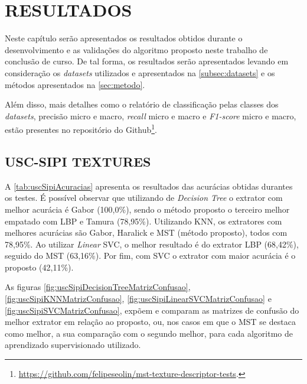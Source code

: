 
\chapter{RESULTADOS}
\label{chap:resultados}

\par Neste capítulo serão apresentados os resultados obtidos durante o desenvolvimento e as validações do algoritmo proposto neste trabalho de conclusão de curso. De tal forma, os resultados serão apresentados levando em consideração os \textit{datasets} utilizados e apresentados na \autoref{subsec:datasets} e os métodos apresentados na \autoref{sec:metodo}.
\par Além disso, mais detalhes como o relatório de classificação pelas classes dos \textit{datasets}, precisão micro e macro, \textit{recall} micro e macro e \textit{F1-score} micro e macro, estão presentes no repositório do Github\footnote{\url{https://github.com/felipeseolin/mst-texture-descriptor-tests}.}.

\section{USC-SIPI TEXTURES}
\label{sec:uscSipiTextures}

A \autoref{tab:uscSipiAcuracias} apresenta os resultados das acurácias obtidas durantes os testes. É possível observar que utilizando de \textit{Decision Tree} o extrator com melhor acurácia é Gabor (100,0\%), sendo o método proposto o terceiro melhor empatado com LBP e Tamura (78,95\%). Utilizando KNN, os extratores com melhores acurácias são Gabor, Haralick e MST (método proposto), todos com 78,95\%. Ao utilizar \textit{Linear} SVC, o melhor resultado é do extrator LBP (68,42\%), seguido do MST (63,16\%). Por fim, com SVC o extrator com maior acurácia é o proposto (42,11\%).



\par As figuras \ref{fig:uscSipiDecisionTreeMatrizConfusao}, \ref{fig:uscSipiKNNMatrizConfusao}, \ref{fig:uscSipiLinearSVCMatrizConfusao} e \ref{fig:uscSipiSVCMatrizConfusao}, expõem e comparam as matrizes de confusão do melhor extrator em relação ao proposto, ou, nos casos em que o MST se destaca como melhor, a sua comparação com o segundo melhor, para cada algoritmo de aprendizado supervisionado utilizado.

